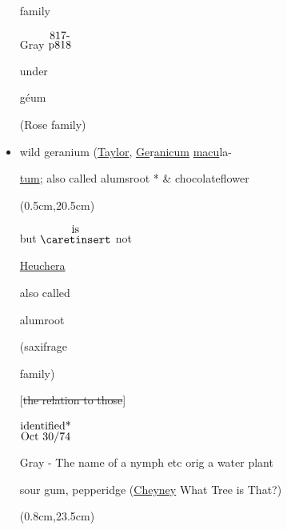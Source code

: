 \documentclass[a4paper,10pt]{article}
\begin{document}
\begin{flushleft}
\begin{itemize}
\begin{minipage}{2in}
    family
\end{minipage}%
\hfill
\begin{minipage}{0.6in}
    Gray $\stackrel{\hbox{817-}}{\hbox{p818}}$ 
\end{minipage}%
\begin{minipage}{0.7in}
    under\par
    g\'eum\par
    (Rose family)
\end{minipage}%
\color{blue}
\normalsize
\item wild geranium (\ul{Taylor}, \ul{Ge}r\ul{anicum} \ul{macu}la-\par
\ul{tum}; also called alumsroot
\color{red}
* 
\color{blue}
\& chocolateflower\par
{}
\color{red}
\begin{textblock*}{3.22in}(0.5cm,20.5cm)%
    \small
    \begin{minipage}{3.22in} 
        \color{red}
        but $\stackrel{\hbox{is}}{\hbox{$\caretinsert$}}$ not\par
        \ul{Heuchera}\par
        also called\par
         alumroot\par
        (saxifrage\par
        family)
        \normalsize
  \end{minipage}%
  \end{textblock*}%
\color{blue}
[\st{the relation to those}]
{$\stackrel{\hbox{identified*}}{\hbox{Oct 30/74}}$}\par
[*neighbor called it wild strawberry, but\par 
no berry]\par
Gray - The name of a nymph etc orig a water plant\par 
sour gum, pepperidge \color{red} (\ul{Cheyney} What Tree is That?)
\begin{textblock*}{2in}(0.8cm,23.5cm)%

\end{textblock*}
\end{itemize}
\end{flushleft}
\end{document}
